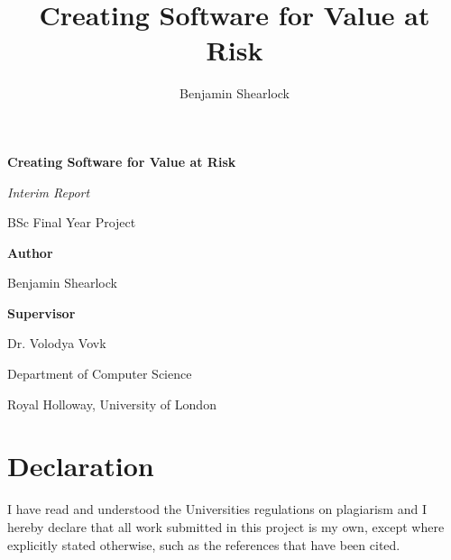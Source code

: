 \documentclass{article}
\title{Creating Software for Value at Risk}
\author{Benjamin Shearlock}
\begin{document}
\raggedright

\begin{titlepage}
  \begin{center}
    \vspace*{1cm}
    {\LARGE \textbf{Creating Software for Value at Risk} \par} 
    \vspace{1.5cm}
    {\Large \textit{Interim Report} \par}
    \vspace{0.5cm}
    {\Large BSc Final Year Project \par}
    \vspace{2cm}
    {\large \textbf{Author} \par}
    {\large Benjamin Shearlock \par}
    \vspace{2cm}
    {\large \textbf{Supervisor} \par}
    {\large Dr. Volodya Vovk \par}
    \vfill
    {\large Department of Computer Science \par}
    {\large Royal Holloway, University of London \par}
  \end{center}
\end{titlepage}

\setlength{\parindent}{0pt}

\section*{Declaration}
I have read and understood the Universities regulations on plagiarism and I hereby declare that all work submitted in this project is my own, except where explicitly stated otherwise, such as the references that have been cited. \\
\end{document}
